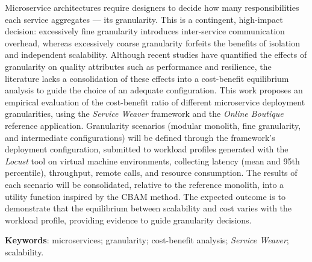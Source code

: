 \begin{resumo}[Abstract]
    \noindent

    Microservice architectures require designers to decide how many responsibilities each service aggregates --- its granularity. This is a contingent, high-impact decision: excessively fine granularity introduces inter-service communication overhead, whereas excessively coarse granularity forfeits the benefits of isolation and independent scalability. Although recent studies have quantified the effects of granularity on quality attributes such as performance and resilience, the literature lacks a consolidation of these effects into a cost-benefit equilibrium analysis to guide the choice of an adequate configuration. This work proposes an empirical evaluation of the cost-benefit ratio of different microservice deployment granularities, using the \textit{Service Weaver} framework and the \textit{Online Boutique} reference application. Granularity scenarios (modular monolith, fine granularity, and intermediate configurations) will be defined through the framework's deployment configuration, submitted to workload profiles generated with the \textit{Locust} tool on virtual machine environments, collecting latency (mean and 95th percentile), throughput, remote calls, and resource consumption. The results of each scenario will be consolidated, relative to the reference monolith, into a utility function inspired by the CBAM method. The expected outcome is to demonstrate that the equilibrium between scalability and cost varies with the workload profile, providing evidence to guide granularity decisions.

    \textbf{Keywords}: microservices; granularity; cost-benefit analysis; \textit{Service Weaver}; scalability.
\end{resumo}
